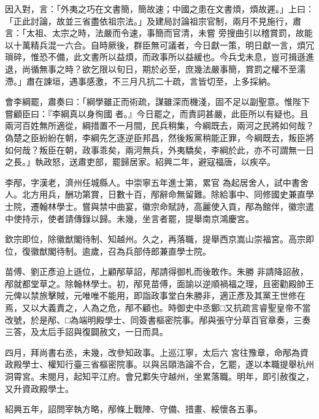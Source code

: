 \begin{pinyinscope}
 因入對，言：「外夷之巧在文書簡，簡故速；中國之患在文書煩，煩故遲。」上曰：「正此討論，故並三省盡依祖宗法。」及建局討論祖宗官制，兩月不見施行，肅言：「太祖、太宗之時，法嚴而令速，事簡而官清，未嘗
 旁搜曲引以稽賞罰，故能以十萬精兵混一六合。自時厥後，群臣無可議者，今日獻一策，明日獻一言，煩冗瑣碎，惟恐不備，此文書所以益煩，而政事所以益緩也。今兵戈未息，豈可揖遜進退，尚循無事之時？欲乞限以旬日，期於必至，庶幾法嚴事簡，賞罰之權不至濡滯。」肅在諫垣，遇事感激，不三月凡抗二十疏，言皆切至，上多採納。



 會李綱罷，肅奏曰：「綱學雖正而術疏，謀雖深而機淺，固不足以副聖意。惟陛下嘗顧臣曰：『李綱真以身徇國
 者。』今日罷之，而責詞甚嚴，此臣所以有疑也。且兩河百姓無所適從，綱措置不一月間，民兵稍集，今綱既去，兩河之民將如何哉？偽楚之臣紛紛在朝，李綱先乞逐逆臣邦昌，然後叛黨稍能正罪，今綱既去，叛臣將如何哉？叛臣在朝，政事乖矣，兩河無兵，外夷驕矣，李綱於此，亦不可謂無一日之長。」執政怒，送肅吏部，罷歸居家。紹興二年，避寇福唐，以疾卒。



 李邴，字漢老，濟州任城縣人。中崇寧五年進士第，累官
 為起居舍人，試中書舍人。北方用兵，酬功第賞，日數十百，邴辭命無留難。除給事中、同修國史兼直學士院，遷翰林學士。嘗與禁中曲宴，徽宗命賦詩，高麗使入貢，邴為館伴，徽宗遣中使持示，使者請傳錄以歸。未幾，坐言者罷，提舉南京鴻慶宮。



 欽宗即位，除徽猷閣待制、知越州。久之，再落職，提舉西京嵩山崇福宮。高宗即位，復徽猷閣待制。逾歲，召為兵部侍郎兼直學士院。



 苗傅、劉正彥迫上遜位，上顧邴草詔，邴請得御札而後敢作。朱勝
 非請降詔赦，邴就都堂草之。除翰林學士。初，邴見苗傅，面諭以逆順禍福之理，且密勸殿帥王元俾以禁旅擊賊，元唯唯不能用，即詣政事堂白朱勝非，適正彥及其黨王世修在焉，又以大義責之，人為之危，邴不顧也。時御史中丞鄭□又抗疏言睿聖皇帝不當改號，於是邴、□為端明殿學士、同簽書樞密院事。邴與張守分草百官章奏，三奏三答，及太后手詔與復闢赦文，一日而具。



 四月，拜尚書右丞，未幾，改參知政事。上巡江寧，太后六
 宮往豫章，命邴為資政殿學士、權知行臺三省樞密院事。以與呂頤浩論不合，乞罷，遂以本職提舉杭州洞霄宮。未閱月，起知平江府。會兄鄴失守越州，坐累落職。明年，即引赦復之，又升資政殿學士。



 紹興五年，詔問宰執方略，邴條上戰陣、守備、措畫、綏懷各五事。




\end{pinyinscope}
